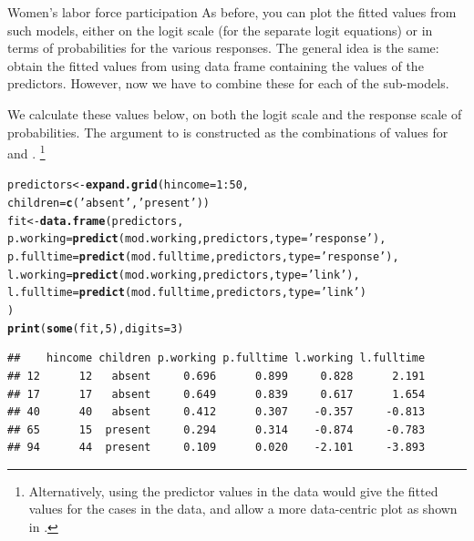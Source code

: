 \documentclass[11pt]{book}\usepackage[]{graphicx}\usepackage[]{color}
\makeatletter
\newcommand{\hlnum}[1]{\textcolor[rgb]{0.686,0.059,0.569}{#1}}%
\newcommand{\hlstr}[1]{\textcolor[rgb]{0.192,0.494,0.8}{#1}}%
\newcommand{\hlopt}[1]{\textcolor[rgb]{0,0,0}{#1}}%
\newcommand{\hlstd}[1]{\textcolor[rgb]{0.345,0.345,0.345}{#1}}%
\newcommand{\hlkwb}[1]{\textcolor[rgb]{0.69,0.353,0.396}{#1}}%
\newcommand{\hlkwc}[1]{\textcolor[rgb]{0.333,0.667,0.333}{#1}}%
\newcommand{\hlkwd}[1]{\textcolor[rgb]{0.737,0.353,0.396}{\textbf{#1}}}%
\newenvironment{kframe}{%
 \def\at@end@of@kframe{}%
 \ifinner\ifhmode%
  \def\at@end@of@kframe{\end{minipage}}%
  \begin{minipage}{\columnwidth}%
 \fi\fi%
 \def\FrameCommand##1{\hskip\@totalleftmargin \hskip-\fboxsep
 \colorbox{shadecolor}{##1}\hskip-\fboxsep
     \hskip-\linewidth \hskip-\@totalleftmargin \hskip\columnwidth}%
 \MakeFramed {\advance\hsize-\width
   \@totalleftmargin\z@ \linewidth\hsize
   \@setminipage}}%
 {\par\unskip\endMakeFramed%
 \at@end@of@kframe}
\newenvironment{knitrout}{}{} %
\renewenvironment{knitrout}{\small\renewcommand{\baselinestretch}{.85}}{} %
\makeatother
\begin{document}
\begin{Example}[wlfpart1]{Women's labor force participation}
As before, you can plot the fitted values from such models, either
on the logit scale (for the separate logit equations) or in
terms of probabilities for the various responses.
The general idea is the same:  obtain the fitted values
from  using data frame containing the values
of the predictors. However, now we have to combine these
for each of the sub-models.

We calculate these values below, on both the logit scale
and the response scale of probabilities. The 
argument to  is constructed as the combinations
of values for  and .%
\footnote{
Alternatively, using the predictor values in the  data
would give the fitted values for the cases in the data,
and allow a more data-centric plot as shown in .
}
\begin{knitrout}\footnotesize
{}\color{fgcolor}\begin{kframe}
\begin{alltt}
\hlstd{predictors} \hlkwb{<-} \hlkwd{expand.grid}\hlstd{(}\hlkwc{hincome}\hlstd{=}\hlnum{1}\hlopt{:}\hlnum{50}\hlstd{,}
                          \hlkwc{children}\hlstd{=}\hlkwd{c}\hlstd{(}\hlstr{'absent'}\hlstd{,} \hlstr{'present'}\hlstd{))}
\hlstd{fit} \hlkwb{<-} \hlkwd{data.frame}\hlstd{(predictors,}
    \hlkwc{p.working} \hlstd{=} \hlkwd{predict}\hlstd{(mod.working, predictors,} \hlkwc{type}\hlstd{=}\hlstr{'response'}\hlstd{),}
    \hlkwc{p.fulltime} \hlstd{=} \hlkwd{predict}\hlstd{(mod.fulltime, predictors,} \hlkwc{type}\hlstd{=}\hlstr{'response'}\hlstd{),}
    \hlkwc{l.working} \hlstd{=} \hlkwd{predict}\hlstd{(mod.working, predictors,} \hlkwc{type}\hlstd{=}\hlstr{'link'}\hlstd{),}
    \hlkwc{l.fulltime} \hlstd{=} \hlkwd{predict}\hlstd{(mod.fulltime, predictors,} \hlkwc{type}\hlstd{=}\hlstr{'link'}\hlstd{)}
\hlstd{)}
\hlkwd{print}\hlstd{(}\hlkwd{some}\hlstd{(fit,} \hlnum{5}\hlstd{),} \hlkwc{digits}\hlstd{=}\hlnum{3}\hlstd{)}
\end{alltt}
\begin{verbatim}
##    hincome children p.working p.fulltime l.working l.fulltime
## 12      12   absent     0.696      0.899     0.828      2.191
## 17      17   absent     0.649      0.839     0.617      1.654
## 40      40   absent     0.412      0.307    -0.357     -0.813
## 65      15  present     0.294      0.314    -0.874     -0.783
## 94      44  present     0.109      0.020    -2.101     -3.893
\end{verbatim}
\end{kframe}

\end{knitrout}
\end{Example}
\end{document}
